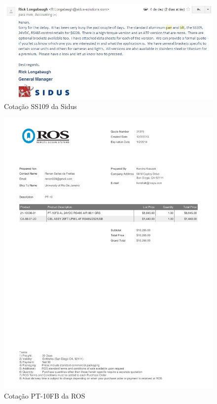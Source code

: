 \begin{figure}[h!]
 \centering
 \includegraphics[width=1\columnwidth]{Pan_Tilt/price_quote_1}
 \caption{Cotação SS109 da Sidus}
\end{figure}

\begin{figure}[h!]
 \centering
 \includegraphics[width=1\columnwidth]{Pan_Tilt/price_quote_2}
 \caption{Cotação PT-10FB da ROS } 
\end{figure}